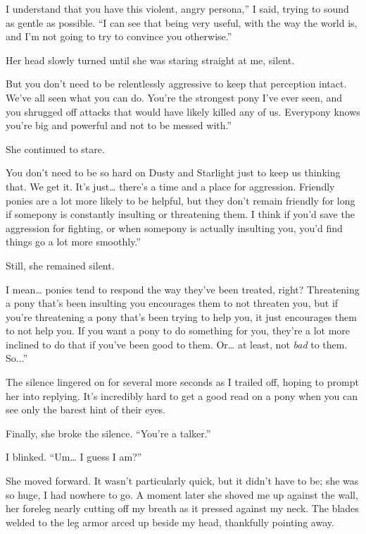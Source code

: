 \leavevmode{}I understand that you have this violent, angry persona,” I said, trying to sound as gentle as possible. “I can see that being very useful, with the way the world is, and I’m not going to try to convince you otherwise.”

Her head slowly turned until she was staring straight at me, silent.

\leavevmode{}But you don’t need to be relentlessly aggressive to keep that perception intact. We’ve all seen what you can do. You’re the strongest pony I’ve ever seen, and you shrugged off attacks that would have likely killed any of us. Everypony knows you’re big and powerful and not to be messed with.”

She continued to stare.

\leavevmode{}You don’t need to be so hard on Dusty and Starlight just to keep us thinking that. We get it. It’s just… there’s a time and a place for aggression. Friendly ponies are a lot more likely to be helpful, but they don’t remain friendly for long if somepony is constantly insulting or threatening them. I think if you’d save the aggression for fighting, or when somepony is actually insulting you, you’d find things go a lot more smoothly.”

Still, she remained silent.

\leavevmode{}I mean… ponies tend to respond the way they’ve been treated, right? Threatening a pony that’s been insulting you encourages them to not threaten you, but if you’re threatening a pony that’s been trying to help you, it just encourages them to not help you. If you want a pony to do something for you, they’re a lot more inclined to do that if you’ve been good to them. Or… at least, not \textit{bad} to them. So...”

The silence lingered on for several more seconds as I trailed off, hoping to prompt her into replying. It’s incredibly hard to get a good read on a pony when you can see only the barest hint of their eyes.

Finally, she broke the silence. “You’re a talker.”

I blinked. “Um… I guess I am?”

She moved forward. It wasn’t particularly quick, but it didn’t have to be; she was so huge, I had nowhere to go. A moment later she shoved me up against the wall, her foreleg nearly cutting off my breath as it pressed against my neck. The blades welded to the leg armor arced up beside my head, thankfully pointing away.

